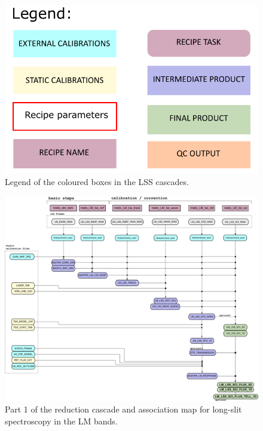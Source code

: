 \begin{figure}[ht]
  \centering
  \includegraphics[width=0.4\textheight]{figures/legend.pdf}
  \caption[Legend]{Legend of the coloured boxes in the \ac{LSS} cascades.}
  \label{Fig:LSScascadelegend}
\end{figure}
\clearpage

\begin{figure}
  \centering
  \includegraphics[width=0.9\textheight]{figures/LM_LSS_pipeline_wf_draft_latest_part_1_v0.82.png}
  \caption[Reduction cascade and association map for LM long-slit
  spectroscopy]{Part 1 of the reduction cascade and association map for long-slit
    spectroscopy in the LM bands.}
  \label{Fig:LMLssAssomap1}
\end{figure}

